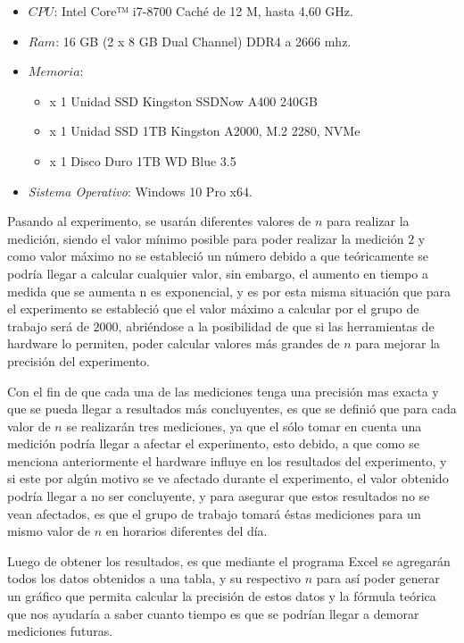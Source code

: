 \documentclass[11pt, twocolumn]{llncs}
\begin{document}
\begin{itemize}
    \item $CPU$: Intel Core™ i7-8700 Caché de 12 M, hasta 4,60 GHz.
    \item $Ram$: 16 GB (2 x 8 GB Dual Channel) DDR4 a 2666 mhz.
    \item $Memoria$:
        \begin{itemize}
             \item x 1 Unidad SSD Kingston SSDNow A400 240GB
        	 \item x 1 Unidad SSD 1TB Kingston A2000, M.2 2280, NVMe
        	 \item x 1 Disco Duro 1TB WD Blue 3.5
        \end{itemize}
    \item \textit{Sistema Operativo}: Windows 10 Pro x64.
\end{itemize}

Pasando al experimento, se usarán diferentes valores de $n$ para realizar la medición, siendo el valor mínimo posible para poder realizar la medición $2$ y como valor máximo no se estableció un número debido a que teóricamente se podría llegar a calcular cualquier valor, sin embargo, el aumento en tiempo a medida que se aumenta n es exponencial, y es por esta misma situación que para el experimento se estableció que el valor máximo a calcular por el grupo de trabajo será de $2000$, abriéndose a la posibilidad de que si las herramientas de hardware lo permiten, poder calcular valores más grandes de $n$ para mejorar la precisión del experimento.

Con el fin de que cada una de las mediciones tenga una precisión mas exacta y que se pueda llegar a resultados más concluyentes, es que se definió que para cada valor de $n$ se realizarán tres mediciones, ya que el sólo tomar en cuenta una medición podría llegar a afectar el experimento, esto debido, a que como se menciona anteriormente el hardware influye en los resultados del experimento, y si este por algún motivo se ve afectado durante el experimento, el valor obtenido podría llegar a no ser concluyente, y para asegurar que estos resultados no se vean afectados, es que el grupo de trabajo tomará éstas mediciones para un mismo valor de $n$ en horarios diferentes del día.

Luego de obtener los resultados, es que mediante el programa Excel se agregarán todos los datos obtenidos a una tabla, y su respectivo $n$ para así poder generar un gráfico que permita calcular la precisión de estos datos y la fórmula teórica que nos ayudaría a saber cuanto tiempo es que se podrían llegar a demorar mediciones futuras.
\end{document}
